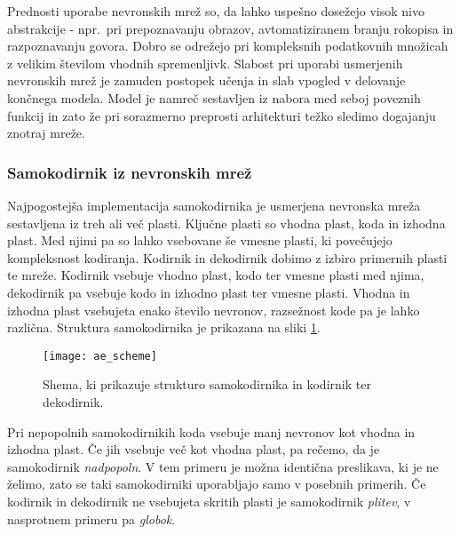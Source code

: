 \documentclass[12pt,a4paper,twoside]{article}
\theoremstyle{definition} %
\theoremstyle{plain} %
\numberwithin{equation}{section}  %
\begin{document}
Prednosti uporabe nevronskih mrež so, da lahko uspešno dosežejo visok nivo abstrakcije - 
npr.\ pri prepoznavanju obrazov, avtomatiziranem branju rokopisa in razpoznavanju govora. 
Dobro se odrežejo pri kompleksnih podatkovnih množicah z velikim številom vhodnih spremenljivk. 
Slabost pri uporabi usmerjenih nevronskih mrež je zamuden postopek učenja in slab vpogled v delovanje končnega modela.
Model je namreč sestavljen iz nabora med seboj poveznih funkcij in zato že pri sorazmerno preprosti arhitekturi težko sledimo dogajanju znotraj mreže.



\subsubsection{Samokodirnik iz nevronskih mrež}



Najpogostejša implementacija samokodirnika je usmerjena nevronska mreža sestavljena iz treh ali več plasti.
Ključne plasti so vhodna plast, koda in izhodna plast.
Med njimi pa so lahko vsebovane še vmesne plasti, ki povečujejo kompleksnost kodiranja. 
Kodirnik in dekodirnik dobimo z izbiro primernih plasti te mreže.
Kodirnik vsebuje vhodno plast, kodo ter vmesne plasti med njima, dekodirnik pa vsebuje kodo in izhodno plast ter vmesne plasti. 
Vhodna in izhodna plast vsebujeta enako število nevronov, razsežnost kode pa je lahko različna. 
Struktura samokodirnika je prikazana na sliki \ref{fig:samokodirnik}.

\begin{figure}[h!]
	\label{fig:samokodirnik}
	\centering
	\texttt{[image: ae\_scheme]}
	\caption[Shema samokodirnika]{Shema, ki prikazuje strukturo samokodirnika in kodirnik ter dekodirnik.}
\end{figure}

Pri nepopolnih samokodirnikih koda vsebuje manj nevronov kot vhodna in izhodna plast. 
Če jih vsebuje več kot vhodna plast, pa rečemo, da je samokodirnik \emph{nadpopoln}. 
V tem primeru je možna identična preslikava, ki je ne želimo, zato se taki samokodirniki uporabljajo samo v posebnih primerih. 
Če kodirnik in dekodirnik ne vsebujeta skritih plasti je samokodirnik \emph{plitev}, v nasprotnem primeru pa \emph{globok}.
\end{document}
